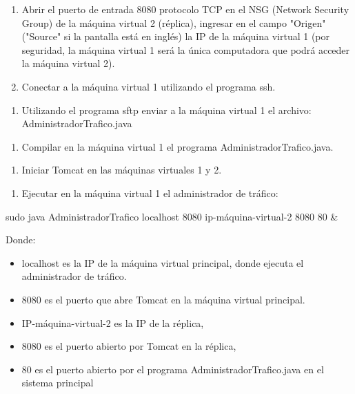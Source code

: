 \begin{enumerate}
\item Abrir el puerto de entrada 8080 protocolo TCP en el NSG (Network Security Group) de la máquina virtual 2 (réplica), ingresar en el campo "Origen" ("Source" si la pantalla está en inglés) la IP de la máquina virtual 1 (por seguridad, la máquina virtual 1 será la única computadora que podrá acceder la máquina virtual 2).
\item Conectar a la máquina virtual 1 utilizando el programa ssh.
\end{enumerate}

\begin{enumerate}
\item Utilizando el programa sftp enviar a la máquina virtual 1 el archivo: AdministradorTrafico.java
\end{enumerate}

\begin{enumerate}
\item Compilar en la máquina virtual 1 el programa AdministradorTrafico.java.
\end{enumerate}

\begin{enumerate}
\item Iniciar Tomcat en las máquinas virtuales 1 y 2.
\end{enumerate}

\begin{enumerate}
\item Ejecutar en la máquina virtual 1 el administrador de tráfico:
\end{enumerate}

\begin{SourceCode}
sudo java AdministradorTrafico localhost 8080 ip-máquina-virtual-2 8080 80 &
\end{SourceCode}

Donde:

\begin{itemize}
\item localhost es la IP de la máquina virtual principal, donde ejecuta el administrador de tráfico.
\item 8080 es el puerto que abre Tomcat en la máquina virtual principal.
\item IP-máquina-virtual-2 es la IP de la réplica,
\item 8080 es el puerto abierto por Tomcat en la réplica,
\item 80 es el puerto abierto por el programa AdministradorTrafico.java en el sistema principal
\end{itemize}

